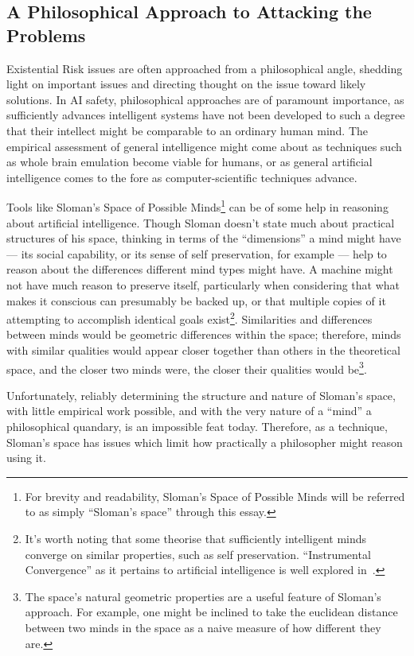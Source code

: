 \subsection{A Philosophical Approach to Attacking the Problems}
Existential Risk issues are often approached from a philosophical angle, shedding light on important issues and directing thought on the issue toward likely solutions. In AI safety, philosophical approaches are of paramount importance, as sufficiently advances intelligent systems have not been developed to such a degree that their intellect might be comparable to an ordinary human mind. The empirical assessment of general intelligence might come about as techniques such as whole brain emulation become viable for humans, or as general artificial intelligence comes to the fore as computer-scientific techniques advance.\par

Tools like Sloman's Space of Possible Minds\footnote{For brevity and readability, Sloman's Space of Possible Minds will be referred to as simply ``Sloman's space'' through this essay.} can be of some help in reasoning about artificial intelligence. Though Sloman doesn't state much about practical structures of his space, thinking in terms of the ``dimensions'' a mind might have --- its social capability, or its sense of self preservation, for example --- help to reason about the differences different mind types might have. A machine might not have much reason to preserve itself, particularly when considering that what makes it conscious can presumably be backed up, or that multiple copies of it attempting to accomplish identical goals exist\footnote{It's worth noting that some theorise that sufficiently intelligent minds converge on similar properties, such as self preservation. ``Instrumental Convergence'' as it pertains to artificial intelligence is well explored in~\cite{basic_ai_drives}.}. Similarities and differences between minds would be geometric differences within the space; therefore, minds with similar qualities would appear closer together than others in the theoretical space, and the closer two minds were, the closer their qualities would be\footnote{The space's natural geometric properties are a useful feature of Sloman's approach. For example, one might be inclined to take the euclidean distance between two minds in the space as a naive measure of how different they are.}.\par

Unfortunately, reliably determining the structure and nature of Sloman's space, with little empirical work possible, and with the very nature of a ``mind'' a philosophical quandary, is an impossible feat today. Therefore, as a technique, Sloman's space has issues which limit how practically a philosopher might reason using it.\par

